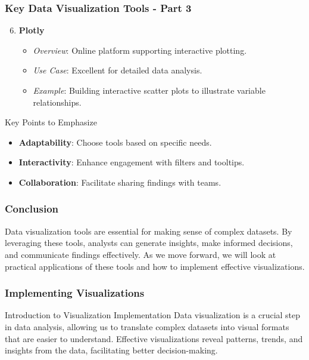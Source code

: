\documentclass[aspectratio=169]{beamer}
\begin{document}
\begin{frame}[fragile]
    \frametitle{Key Data Visualization Tools - Part 3}
    \begin{enumerate}
        \setcounter{enumi}{5}
        \item \textbf{Plotly}
        \begin{itemize}
            \item \textit{Overview}: Online platform supporting interactive plotting.
            \item \textit{Use Case}: Excellent for detailed data analysis.
            \item \textit{Example}: Building interactive scatter plots to illustrate variable relationships.
        \end{itemize}
    \end{enumerate}
    
    \begin{block}{Key Points to Emphasize}
        \begin{itemize}
            \item \textbf{Adaptability}: Choose tools based on specific needs.
            \item \textbf{Interactivity}: Enhance engagement with filters and tooltips.
            \item \textbf{Collaboration}: Facilitate sharing findings with teams.
        \end{itemize}
    \end{block}
\end{frame}

\begin{frame}[fragile]
    \frametitle{Conclusion}
    Data visualization tools are essential for making sense of complex datasets. By leveraging these tools, analysts can generate insights, make informed decisions, and communicate findings effectively. 
    \newline
    As we move forward, we will look at practical applications of these tools and how to implement effective visualizations.
\end{frame}

\begin{frame}
    \frametitle{Implementing Visualizations}
    \begin{block}{Introduction to Visualization Implementation}
        Data visualization is a crucial step in data analysis, allowing us to translate complex datasets into visual formats that are easier to understand.
        Effective visualizations reveal patterns, trends, and insights from the data, facilitating better decision-making.
    \end{block}
\end{frame}
\end{document}
